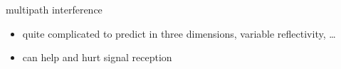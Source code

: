 \begin{frame}{multipath interference}
    \begin{itemize}
    \item quite complicated to predict in three dimensions, variable reflectivity, \ldots
    \item can help and hurt signal reception
    \end{itemize}
\end{frame}


